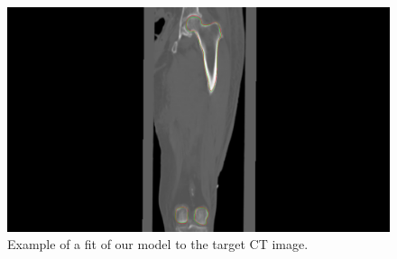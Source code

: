 \begin{figure}
	\centering
  \includegraphics[width=\columnwidth]{./Figures/local_minimum_y-axis}
  \caption{
    Example of a fit of our model to the target CT image. }
  \label{fig:targetfit}
\end{figure}
